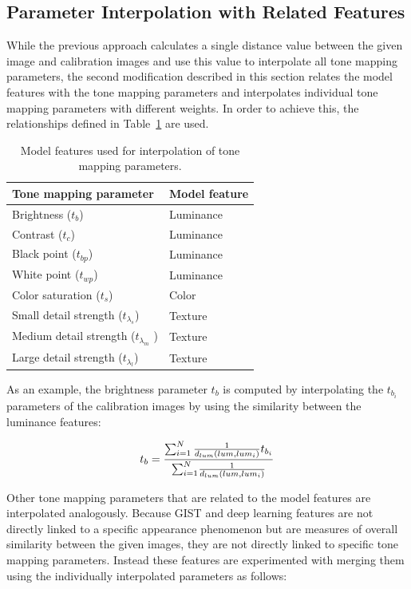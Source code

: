 \subsection{Parameter Interpolation with Related Features}
\label{sec:related_features}
While the previous approach calculates a single distance value between the given image and calibration images and use this value to interpolate all tone mapping parameters, the second modification described in this section relates the model features with the tone mapping parameters and interpolates individual tone mapping parameters with different weights. In order to achieve this, the relationships defined in Table~\ref{tab:feature_mapping} are used.

\begin{table}
\caption{Model features used for interpolation of tone mapping parameters.}
\centering
\begin{tabular}{l | l}
\label{tab:feature_mapping}
\textbf{Tone mapping parameter} & \textbf{Model feature}\\
\hline
Brightness ($t_b$) & Luminance \\
Contrast ($t_c$) & Luminance \\
Black point ($t_{bp}$) & Luminance \\
White point ($t_{wp}$) & Luminance \\
Color saturation ($t_s$) & Color \\
Small detail strength ($t_{\lambda_s}$) & Texture \\
Medium detail strength ($t_{\lambda_m}$ ) & Texture \\
Large detail strength ($t_{\lambda_l}$) & Texture
\end{tabular}
\end{table}


As an example, the brightness parameter $t_b$ is computed by interpolating the $t_{b_i}$ parameters of the calibration images by using the similarity between the luminance features:

\begin{equation}
   t_b = { {\sum_{i=1}^N { {1} \over {d_{lum} (lum, lum_i)} } t_{b_i} } \over {\sum_{i=1}^N} { {1} \over {d_{lum} (lum, lum_i)} } }
\end{equation}

Other tone mapping parameters that are related to the model features are interpolated analogously. Because GIST and deep learning features are not directly linked to a specific appearance phenomenon but are measures of overall similarity between the given images, they are not directly linked to specific tone mapping parameters. Instead these features are experimented with merging them using the individually interpolated parameters as follows: 

